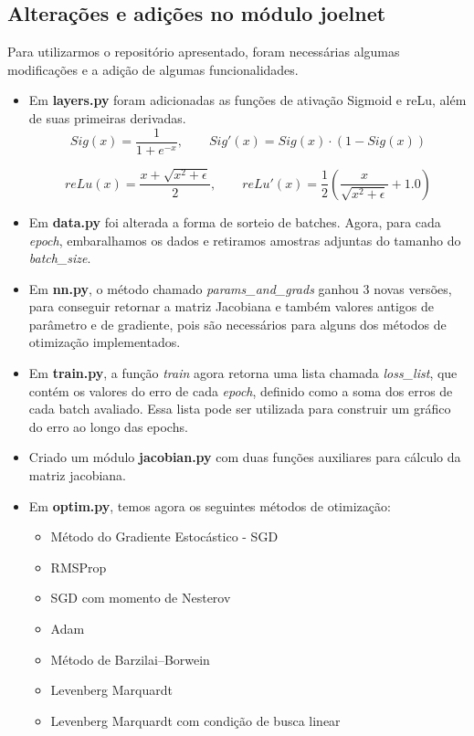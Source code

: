 \documentclass[11pt]{article}
\begin{document}
\subsection*{Alterações e adições no módulo joelnet}
Para utilizarmos o repositório apresentado, foram necessárias algumas modificações e a adição de algumas funcionalidades.
\begin{itemize}
\item Em \textbf{layers.py} foram adicionadas as funções de ativação Sigmoid e reLu, além de suas primeiras derivadas.
$$Sig(x) = \frac{1}{1 + e^{-x}} ,\qquad Sig'(x) = Sig(x)\cdot (1 - Sig(x)) $$

$$reLu(x) = \frac{x + \sqrt{x^2 + \epsilon}}{2} ,\qquad reLu'(x) = \frac{1}{2}\left(\frac{x}{\sqrt{x^2 + \epsilon}} + 1.0\right)$$

\item Em \textbf{data.py} foi alterada a forma de sorteio de batches. Agora, para cada \textit{epoch}, embaralhamos os dados e retiramos amostras adjuntas do tamanho do \textit{batch\_size}. 
\item Em \textbf{nn.py}, o método chamado \textit{params\_and\_grads} ganhou 3 novas versões, para conseguir retornar a matriz Jacobiana e também valores antigos de parâmetro e de gradiente, pois são necessários para alguns dos métodos de otimização implementados.
\item Em \textbf{train.py}, a função \textit{train} agora retorna uma lista chamada \textit{loss\_list}, que contém os valores do erro de cada \textit{epoch}, definido como a soma dos erros de cada batch avaliado. Essa lista pode ser utilizada para construir um gráfico do erro ao longo das epochs.
\item Criado um módulo \textbf{jacobian.py} com duas funções auxiliares para cálculo da matriz jacobiana.
\item Em \textbf{optim.py}, temos agora os seguintes métodos de otimização:
\begin{itemize}
	\item Método do Gradiente Estocástico - SGD
	\item RMSProp
	\item SGD com momento de Nesterov
	\item Adam
	\item Método de Barzilai–Borwein
	\item Levenberg Marquardt
	\item Levenberg Marquardt com condição de busca linear
\end{itemize}




\end{itemize}
\end{document}
